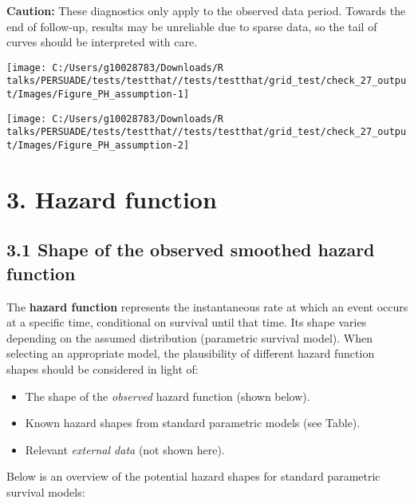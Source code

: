 \documentclass[
]{article}
\providecommand{\tightlist}{%
  \setlength{\itemsep}{0pt}\setlength{\parskip}{0pt}}
\begin{document}
\textbf{Caution:} These diagnostics only apply to the observed data
period. Towards the end of follow-up, results may be unreliable due to
sparse data, so the tail of curves should be interpreted with care.

\clearpage

\begin{flushleft}\texttt{[image: C:/Users/g10028783/Downloads/R talks/PERSUADE/tests/testthat//tests/testthat/grid\_test/check\_27\_output/Images/Figure\_PH\_assumption-1]} \end{flushleft}

\begin{flushleft}\texttt{[image: C:/Users/g10028783/Downloads/R talks/PERSUADE/tests/testthat//tests/testthat/grid\_test/check\_27\_output/Images/Figure\_PH\_assumption-2]} \end{flushleft}

\clearpage

\section{3. Hazard function}\label{hazard-function}

\subsection{3.1 Shape of the observed smoothed hazard
function}\label{shape-of-the-observed-smoothed-hazard-function}

The \textbf{hazard function} represents the instantaneous rate at which
an event occurs at a specific time, conditional on survival until that
time. Its shape varies depending on the assumed distribution (parametric
survival model). When selecting an appropriate model, the plausibility
of different hazard function shapes should be considered in light of:

\begin{itemize}
\tightlist
\item
  The shape of the \emph{observed} hazard function (shown below).
\item
  Known hazard shapes from standard parametric models (see Table).
\item
  Relevant \emph{external data} (not shown here).
\end{itemize}

Below is an overview of the potential hazard shapes for standard
parametric survival models:
\end{document}
